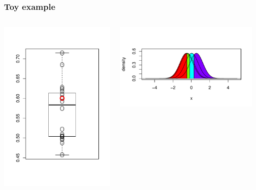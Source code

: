 \documentclass{beamer}
\begin{document}
\begin{frame}
\frametitle{Toy example}
\begin{columns}
\begin{column}{0.5\textwidth}
\includegraphics[scale = 0.5]{../extrapolation/autoplots/box4_1.pdf}
\end{column}
\begin{column}{0.5\textwidth}
\includegraphics[scale = 0.5]{../extrapolation/autoplots/dens4_1.pdf}
\end{column}
\end{columns}
\end{frame}
\end{document}
